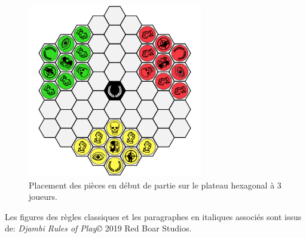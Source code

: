 \documentclass{article}
\begin{document}
\begin{figure}[ht]
\centering
\includegraphics[width=3in,height=3in]{media/dja_3_tablier.png}
\caption{Placement des pièces en début de partie sur le plateau hexagonal à 3 joueurs.}
\end{figure}

\vspace{5pt} %

Les figures des règles classiques et les paragraphes en italiques associés sont issus de: \textit{Djambi Rules of Play©} 2019 Red Boar Studios.
\end{document}
